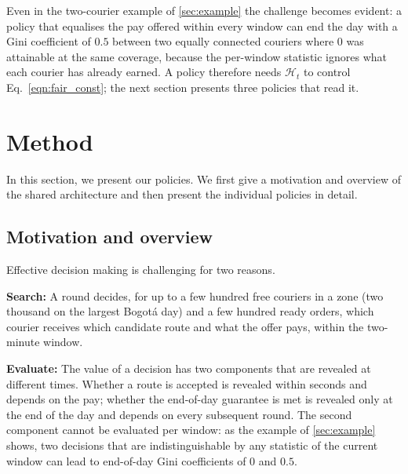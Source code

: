 \documentclass[a4paper,11pt,review,3p,authoryear]{elsarticle}
\newcommand{\Hist}{\mathcal{H}}
\begin{document}
Even in the two-courier example of \ref{sec:example} the challenge becomes evident: a policy that equalises the pay offered within every window can end the day with a Gini coefficient of $0.5$ between two equally connected couriers where $0$ was attainable at the same coverage, because the per-window statistic ignores what each courier has already earned. A policy therefore needs $\Hist_t$ to control Eq.~\eqref{eqn:fair_const}; the next section presents three policies that read it.

\section{Method}
\label{sec:method}

In this section, we present our policies. We first give a motivation and overview of the shared architecture and then present the individual policies in detail.

\subsection{Motivation and overview}
\label{sec:motivation_method}

Effective decision making is challenging for two reasons.

\begin{compactitem}
    \item \textbf{Search:} A round decides, for up to a few hundred free couriers in a zone (two thousand on the largest Bogot\'a day) and a few hundred ready orders, which courier receives which candidate route and what the offer pays, within the two-minute window.
    \item \textbf{Evaluate:} The value of a decision has two components that are revealed at different times. Whether a route is accepted is revealed within seconds and depends on the pay; whether the end-of-day guarantee is met is revealed only at the end of the day and depends on every subsequent round. The second component cannot be evaluated per window: as the example of \ref{sec:example} shows, two decisions that are indistinguishable by any statistic of the current window can lead to end-of-day Gini coefficients of $0$ and $0.5$.
\end{compactitem}
\end{document}
